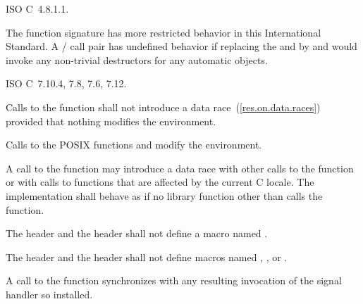 \xref ISO C~4.8.1.1.

\pnum
The function signature
%
has more restricted behavior in this International Standard.
A / call pair has undefined
behavior if replacing the  and 
by  and  would invoke any non-trivial destructors for any automatic
objects.

\xref ISO C~7.10.4, 7.8, 7.6, 7.12.

\pnum
Calls to the function
%
 shall not introduce a data
race~(\ref{res.on.data.races}) provided that nothing modifies the environment.
\begin{note} Calls to the POSIX functions
%
 and
%
 modify the
environment. \end{note}

\pnum
A call to the  function may introduce a data race with other
calls to the  function or with calls to functions that are
affected by the current C locale. The implementation shall behave as if no
library function other than  calls the 
function.

\pnum
{}%
%
The header  and the header  shall not
define a macro named .

\pnum
{}%
%
The header  and the header  shall not
define macros named , , or .

\pnum
A call to the function  synchronizes with any resulting
invocation of the signal handler so installed.

